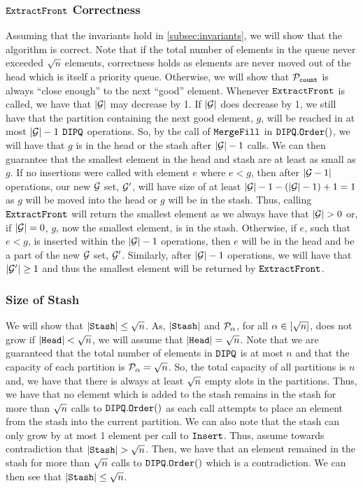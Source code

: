 \subsubsection*{$\texttt{ExtractFront}$ Correctness}
Assuming that the invariants hold in \cref{subsec:invariants}, we will show that the algorithm is correct.
Note that if the total number of elements in the queue never exceeded ${\sqrt{n}}$ elements, correctness holds as elements are never moved out of the head which is itself a priority queue.
Otherwise, we will show that $\mathcal{P}_{\texttt{count}}$ is always ``close enough'' to the next ``good'' element.
Whenever $\texttt{ExtractFront}$ is called, we have that $|\mathcal{G}|$ may decrease by 1. If $|\mathcal{G}|$ does decrease by 1,
we still have that the partition containing the next good element, $g$, will be reached in at most $|\mathcal{G}| - 1$ $\texttt{DIPQ}$ operations.
So, by the call of $\texttt{MergeFill}$ in $\texttt{DIPQ}.\texttt{Order}()$, we will have that $g$ is in the head or the stash
after $|\mathcal{G}| - 1$ calls. 
We can then guarantee that the smallest element in the head and stash are at least as small as $g$.
If no insertions were called with element $e$ where $e < g$,
then after $|\mathcal{G} - 1|$ operations, our new $\mathcal{G}$ set, $\mathcal{G}'$, will have size of at least $|\mathcal{G}| - 1 - (|\mathcal{G}| - 1) + 1 = 1$
as $g$ will be moved into the head or $g$ will be in the stash. Thus, calling $\texttt{ExtractFront}$ will return the smallest element as we always have that $|\mathcal{G}| > 0$ or, if $|\mathcal{G}| = 0$, $g$, now the smallest element, is in the stash.
Otherwise, if $e$, such that $e < g$, is inserted within the $|\mathcal{G}| - 1$ operations, then $e$ will be in the head and be a part of the new $\mathcal{G}$ set, $\mathcal{G}'$.
Similarly, after $|\mathcal{G}| - 1$ operations, we will have that $|\mathcal{G}'| \geq 1$ and thus the smallest element will be returned by $\texttt{ExtractFront}$.

\subsubsection*{Size of Stash}
We will show that $|\texttt{Stash}| \leq {\sqrt{n}}$. As, $|\texttt{Stash}|$ and $\mathcal{P}_\alpha$, for all $\alpha \in [{\sqrt{n}}]$, does not grow if $|\texttt{Head}| < {\sqrt{n}}$,
we will assume that $|\texttt{Head}| = {\sqrt{n}}$. 
Note that we are guaranteed that the total number of elements in $\texttt{DIPQ}$ is at most $n$ and that the capacity of each partition is $\mathcal{P}_\alpha = {\sqrt{n}}$.
So, the total capacity of all partitions is $n$ and, we have that there is always at least ${\sqrt{n}}$ empty slots in the partitions.
Thus, we have that no element which is added to the stash remains
in the stash for more than ${\sqrt{n}}$ calls to $\texttt{DIPQ}.\texttt{Order}()$ as each call attempts to place an element from the stash into the current partition.
We can also note that the stash can only grow by at most 1 element per call to $\texttt{Insert}$.
Thus, assume towards contradiction that $|\texttt{Stash}| > {\sqrt{n}}$. Then, we have that an element remained in the stash
for more than ${\sqrt{n}}$ calls to $\texttt{DIPQ}.\texttt{Order}()$ which is a contradiction.
We can then see that $|\texttt{Stash}| \leq {\sqrt{n}}$.

